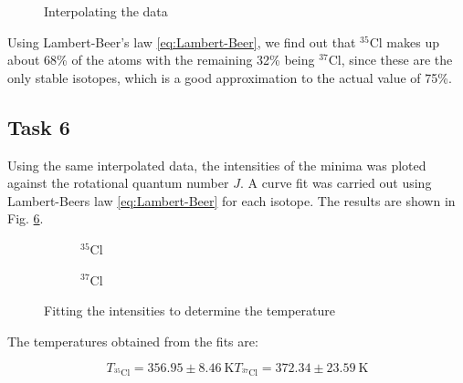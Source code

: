 \documentclass{article}
\begin{document}
\begin{figure}[H]
	\centering
	\begin{subfigure}{0.45\textwidth}
		\centering
		\scalebox{0.50}{}
		\label{fig:original_interpolated_data_p_branch}
	\end{subfigure}
	\hspace{0.5cm}
	\begin{subfigure}{0.45\textwidth}
		\centering
		\scalebox{0.50}{}
		\label{fig:intensity_p_branch}
	\end{subfigure}
	\caption{Interpolating the data}
	\label{fig:Interpolation}
\end{figure}

Using Lambert-Beer's law \ref{eq:Lambert-Beer}, we find out that $^{35} \mathrm{Cl}$ makes up about 68\% of the atoms with the remaining 32\% being $^{37} \mathrm{Cl}$, since these are the only stable isotopes, which is a good approximation to the actual value of 75\%.

\subsection{Task 6}

Using the same interpolated data, the intensities of the minima was ploted against the rotational quantum number $J$. A curve fit was carried out using Lambert-Beers law \ref{eq:Lambert-Beer} for each isotope. The results are shown in Fig. \ref{fig:Task6}.



\begin{figure}[H]
	\centering
	\begin{subfigure}{0.45\textwidth}
		\centering
		\scalebox{0.50}{}
		\caption{$^{35}$Cl}
		\label{fig:Cl35_intensities}
	\end{subfigure}	
	\hspace{0.5cm}
	\begin{subfigure}{0.45\textwidth}
		\centering
		\scalebox{0.50}{}
		\caption{$^{37}$Cl}
		\label{fig:Cl37_intensities}
	\end{subfigure}	
	\label{fig:Task6}
	\caption{Fitting the intensities to determine the temperature}
\end{figure}

The temperatures obtained from the fits are: 

\begin{equation}
	T_{^{35} \mathrm{Cl}} = 356.95 \pm 8.46 \ \text{K}
	T_{^{37} \mathrm{Cl}} = 372.34 \pm 23.59 \ \text{K}
\end{equation}
\end{document}
